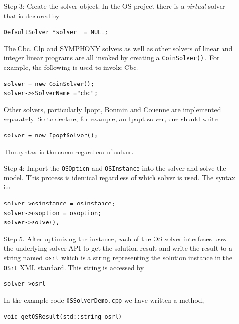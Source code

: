 \documentclass[11pt]{article}
\renewcommand{\_}{{\char"5F}}
\renewcommand{\{}{{\char"7B}}
\renewcommand{\}}{{\char"7D}}
\renewcommand{\^}{{\char"0D}}
\renewcommand{\'}{{\char"0D}}
\begin{document}
\begin{enumerate}[Step 1:]
\begin{itemize}
\item[Step 3:] Create the solver object. In the OS project there is a {\it virtual} solver that 
is declared by

\begin{verbatim}
DefaultSolver *solver  = NULL;
\end{verbatim}

The Cbc, Clp and SYMPHONY solvers as well as other solvers of linear and integer linear programs
are all invoked by creating a {\tt CoinSolver().} For example, the following is used to invoke Cbc.

\begin{verbatim}
solver = new CoinSolver();
solver->sSolverName ="cbc";
\end{verbatim}

Other solvers, particularly Ipopt, Bonmin and Couenne are implemented separately. So to declare,
for example, an Ipopt solver, one should write

\begin{verbatim}
solver = new IpoptSolver();
\end{verbatim}

The syntax is the same regardless of solver. 

\item[Step 4:] Import the {\tt OSOption} and {\tt OSInstance} into the solver and solve the model. 
This process is identical regardless of which solver is used. The syntax is:

\begin{verbatim}
solver->osinstance = osinstance;
solver->osoption = osoption;	
solver->solve();
\end{verbatim}

\item[Step 5:] After optimizing the instance,  each of the OS solver interfaces uses the underlying solver API to get the solution result and write the result to a string 
named {\tt osrl} which is a string representing the solution instance in the {\tt OSrL} XML standard.  
This string is accessed by

\begin{verbatim}
solver->osrl
\end{verbatim}


In the example code {\tt OSSolverDemo.cpp} we have written a method,  

\begin{verbatim}
void getOSResult(std::string osrl)
\end{verbatim}


\end{itemize}
\end{enumerate}
\end{document}
